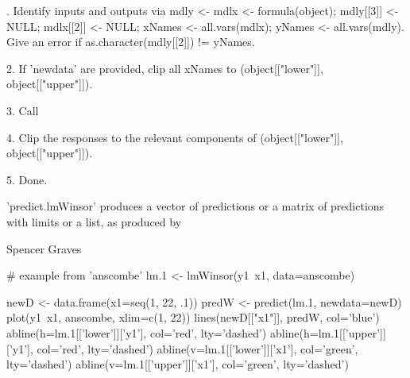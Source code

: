 \documentclass{article}
\begin{document}
\begin{Details}.  Identify inputs and outputs via mdly <- mdlx <- formula(object);
mdly[[3]] <- NULL;  mdlx[[2]] <- NULL;  xNames <- all.vars(mdlx);
yNames <- all.vars(mdly).  Give an error if as.character(mdly[[2]]) !=
yNames.  

2.  If 'newdata' are provided, clip all xNames to (object[["lower"]],
object[["upper"]]). 

3.  Call   

4.  Clip the responses to the relevant components of
(object[["lower"]], object[["upper"]]).

5.  Done.
\end{Details}
\begin{Value}
'predict.lmWinsor' produces a vector of predictions or a matrix of
predictions with limits or a list, as produced by
\end{Value}
\begin{Author}\relax
Spencer Graves
\end{Author}
\begin{SeeAlso}\relax
{}
\end{SeeAlso}
\begin{Examples}
\begin{ExampleCode}
# example from 'anscombe' 
lm.1 <- lmWinsor(y1~x1, data=anscombe)

newD <- data.frame(x1=seq(1, 22, .1))
predW <- predict(lm.1, newdata=newD) 
plot(y1~x1, anscombe, xlim=c(1, 22)) 
lines(newD[["x1"]], predW, col='blue')
abline(h=lm.1[['lower']]['y1'], col='red', lty='dashed') 
abline(h=lm.1[['upper']]['y1'], col='red', lty='dashed')
abline(v=lm.1[['lower']]['x1'], col='green', lty='dashed') 
abline(v=lm.1[['upper']]['x1'], col='green', lty='dashed') 

\end{ExampleCode}
\end{Examples}
\end{document}
